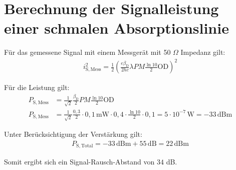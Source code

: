
\section{Berechnung der Signalleistung einer schmalen Absorptionslinie}
\label{sec:signalAbsorp}

Für das gemessene Signal mit einem Messgerät mit 50 $\Omega$ Impedanz gilt:
\begin{gather}
    i_\mathrm{S,Mess}^2 = \frac{1}{2}(\frac{e\beta_\mathrm{D}}{2hc}\lambda P M \frac{\ln10}{2}\mathrm{OD})^2
\end{gather}

Für die Leistung gilt:
\begin{align}
    \label{eq:leistungPhotosignal}
    P_\mathrm{S,Mess} &= \frac{1}{\sqrt{2}}\frac{\beta_\mathrm{D}}{2} P M \frac{\ln10}{2} \mathrm{OD}\\
    P_\mathrm{S,Mess} &= \frac{1}{\sqrt{2}}\frac{0,3}{2} \cdot 0,1 \, \text{mW} \cdot 0,4 \cdot \frac{\ln10}{2} \cdot 0,1 = 5 \cdot 10^{-7} \, \text{W} = -33 \, \text{dBm}
\end{align}

Unter Berücksichtigung der Verstärkung gilt:
\begin{gather}
    P_\mathrm{S,Total} = -33 \, \text{dBm} + 55 \, \text{dB} = 22 \, \text{dBm}
\end{gather}

Somit ergibt sich ein Signal-Rausch-Abstand von $34$ dB.